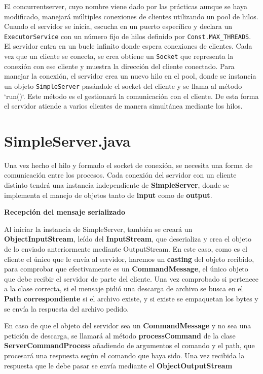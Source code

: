 \documentclass[a4paper, 12pt]{report}
\begin{document}
El concurrentserver, cuyo nombre viene dado por las prácticas aunque se haya modificado, manejará múltiples
conexiones de clientes utilizando un pool de hilos. Cuando el servidor se inicia, escucha en un puerto
específico y declara un \texttt{ExecutorService}  con un número fijo de hilos definido por
\texttt{Const.MAX\_THREADS}. El servidor entra en un bucle infinito donde espera conexiones de clientes. Cada
vez que un cliente se conecta, se crea obtiene un \texttt{Socket} que
representa la conexión con ese cliente y muestra la dirección del cliente
conectado. Para manejar la conexión, el servidor crea un nuevo hilo en el pool, donde se instancia un
objeto \texttt{SimpleServer} pasándole el socket del cliente y se llama al método `run()`. Este método es el
gestionará la comunicación con el cliente. De esta forma el servidor atiende a varios
clientes de manera simultánea mediante los hilos.

\section{SimpleServer.java}

Una vez hecho el hilo y formado el socket de conexión, se necesita una forma de comunicación entre los procesos. Cada conexión del servidor con un cliente distinto tendrá una instancia independiente de \textbf{SimpleServer}, donde se implementa el manejo de objetos tanto de \textbf{input} como de \textbf{output}.

\textbf{Recepción del mensaje serializado}

Al iniciar la instancia de SimpleServer, también se creará un \textbf{ObjectInputStream}, leído del \textbf{InputStream}, que deserializa y crea el objeto de lo enviado anteriormente mediante OutputStream.
En este caso, como es el cliente el único que le envía al servidor, haremos un \textbf{casting} del objeto recibido, para comprobar que efectivamente es un \textbf{CommandMessage}, el único objeto que debe recibir el servidor de parte del cliente. Una vez comprobado si pertenece a la clase correcta, si el mensaje pidió una descarga de archivo se busca en el \textbf{Path correspondiente} si el archivo existe, y si existe se empaquetan los bytes y se envía la respuesta del archivo pedido.

En caso de que el objeto del servidor sea un \textbf{CommandMessage} y no sea una petición de descarga, se llamará al método \textbf{processCommand} de la clase \textbf{ServerCommandProcess} añadiendo de argumentos el comando y el path, que procesará una respuesta según el comando que haya sido. Una vez recibida la respuesta que le debe pasar se envía mediante el \textbf{ObjectOutputStream}
\end{document}
